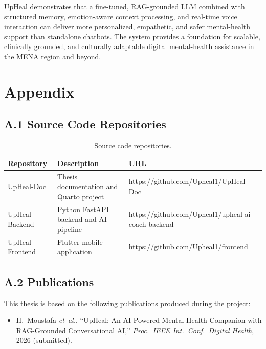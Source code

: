 \documentclass[12pt,a4paper,oneside,openany]{report}
\begin{document}
UpHeal demonstrates that a fine-tuned, RAG-grounded LLM combined with structured memory, emotion-aware context processing, and real-time voice interaction can deliver more personalized, empathetic, and safer mental-health support than standalone chatbots. The system provides a foundation for scalable, clinically grounded, and culturally adaptable digital mental-health assistance in the MENA region and beyond.

\chapter*{Appendix}

\section*{A.1 Source Code Repositories}

\begin{table}[H]
\centering\small
\caption{Source code repositories.}
\label{tab:repos}
\begin{tabular}{@{}lll@{}}
\toprule
Repository & Description & URL \\
\midrule
UpHeal-Doc & Thesis documentation and Quarto project & https://github.com/Upheal1/UpHeal-Doc \\
UpHeal-Backend & Python FastAPI backend and AI pipeline & https://github.com/Upheal1/upheal-ai-coach-backend \\
UpHeal-Frontend & Flutter mobile application & https://github.com/Upheal1/frontend \\
\bottomrule
\end{tabular}
\end{table}

\section*{A.2 Publications}

This thesis is based on the following publications produced during the project:

\begin{itemize}[nosep]
\item H.~Moustafa \textit{et~al.}, ``UpHeal: An AI-Powered Mental Health Companion with RAG-Grounded Conversational AI,'' \textit{Proc.\ IEEE Int.\ Conf.\ Digital Health}, 2026 (submitted).
\end{itemize}

\printbibliography[heading=bibintoc,title={References}]
\end{document}
